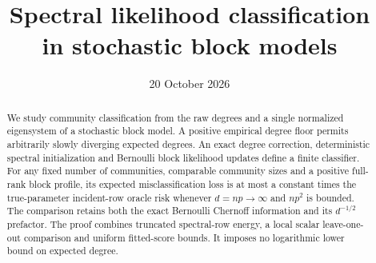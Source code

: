 \documentclass[11pt]{article}
\title{Spectral likelihood classification\\in stochastic block models}
\author{}
\date{20 October 2026}
\theoremstyle{definition}
\theoremstyle{remark}
\begin{document}
\maketitle
\begin{abstract}
We study community classification from the raw degrees and a single
normalized eigensystem of a stochastic block model. A positive empirical
degree floor permits arbitrarily slowly diverging expected degrees.
An exact degree correction, deterministic spectral initialization and
Bernoulli block likelihood updates define a finite classifier. For any
fixed number of communities, comparable community sizes and a positive
full-rank block profile, its expected misclassification loss is at most
a constant times the true-parameter incident-row oracle risk whenever
\(d=np\to\infty\) and \(np^2\) is bounded. The comparison retains both the
exact Bernoulli Chernoff information and its \(d^{-1/2}\) prefactor.
The proof combines truncated spectral-row energy, a local scalar
leave-one-out comparison and uniform fitted-score bounds. It imposes
no logarithmic lower bound on expected degree.
\end{abstract}

\appendix









\end{document}
